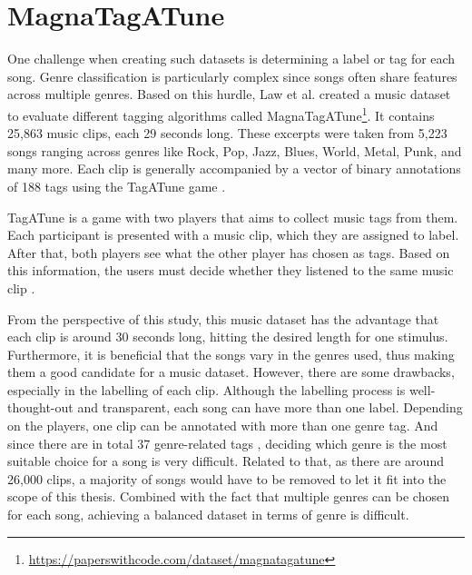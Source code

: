   \section{MagnaTagATune}
    One challenge when creating such datasets is determining a label or tag for each song. Genre classification is particularly complex since songs often share features across multiple genres. Based on this hurdle, Law et al. created a music dataset to evaluate different tagging algorithms called MagnaTagATune\footnote{\url{https://paperswithcode.com/dataset/magnatagatune}}. It contains 25,863 music clips, each 29 seconds long. These excerpts were taken from 5,223 songs ranging across genres like Rock, Pop, Jazz, Blues, World, Metal, Punk, and many more. Each clip is generally accompanied by a vector of binary annotations of 188 tags using the TagATune game \cite{güçlü2016brainsbeats}. \par
    TagATune is a game with two players that aims to collect music tags from them. Each participant is presented with a music clip, which they are assigned to label. After that, both players see what the other player has chosen as tags. Based on this information, the users must decide whether they listened to the same music clip \cite{law2009evaluation}. \par
    From the perspective of this study, this music dataset has the advantage that each clip is around 30 seconds long, hitting the desired length for one stimulus. Furthermore, it is beneficial that the songs vary in the genres used, thus making them a good candidate for a music dataset. However, there are some drawbacks, especially in the labelling of each clip. Although the labelling process is well-thought-out and transparent, each song can have more than one label. Depending on the players, one clip can be annotated with more than one genre tag. And since there are in total 37 genre-related tags \cite{rotheneder2023explanation}, deciding which genre is the most suitable choice for a song is very difficult. Related to that, as there are around 26,000 clips, a majority of songs would have to be removed to let it fit into the scope of this thesis. Combined with the fact that multiple genres can be chosen for each song, achieving a balanced dataset in terms of genre is difficult.


